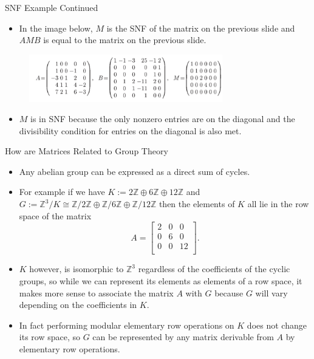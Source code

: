 \documentclass{beamer}
\begin{document}
\begin{frame}{SNF Example Continued}
    \begin{itemize}
        \item In the image below, $M$ is the SNF of the matrix on the previous slide and $AMB$ is equal to the matrix on the previous slide.
    \end{itemize}
    \begin{figure}
        \centering
        \includegraphics[width=0.75\textwidth]{Iter3.png}
    \end{figure}
    \begin{itemize}
        \item $M$ is in SNF because the only nonzero entries are on the diagonal and the divisibility condition for entries on the diagonal is also met.
    \end{itemize}
\end{frame}
\begin{frame}{How are Matrices Related to Group Theory}
    \begin{itemize}
        \item Any abelian group can be expressed as a direct sum of cycles.
        \item For example if we have $K := 2\mathbb{Z} \oplus 6\mathbb{Z} \oplus 12\mathbb{Z}$ and $G := \mathbb{Z}^3/K \cong \mathbb{Z}/2\mathbb{Z} \oplus \mathbb{Z}/6\mathbb{Z} \oplus \mathbb{Z}/12\mathbb{Z}$ then the elements of $K$ all lie in the row space of the matrix
        $$A = \begin{bmatrix}
            2 & 0 & 0\\
            0 & 6 & 0\\
            0 & 0 & 12\\
        \end{bmatrix}.$$
        \item $K$ however, is isomorphic to $\mathbb{Z}^3$ regardless of the coefficients of the cyclic groups, so while we can represent its elements as elements of a row space, it makes more sense to associate the matrix $A$ with $G$ because $G$ will vary depending on the coefficients in $K$.
        \item In fact performing modular elementary row operations on $K$ does not change its row space, so $G$ can be represented by any matrix derivable from $A$ by elementary row operations.
    \end{itemize}
\end{frame}
\end{document}
